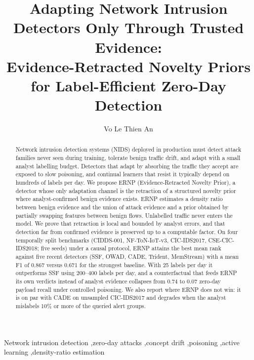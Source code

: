 \documentclass[preprint,12pt]{elsarticle}
\begin{document}
\begin{frontmatter}

\title{Adapting Network Intrusion Detectors Only Through Trusted Evidence:\\ Evidence-Retracted Novelty Priors for Label-Efficient Zero-Day Detection}

\author[aff1]{Vo Le Thien An}

\begin{abstract}
Network intrusion detection systems (NIDS) deployed in production must detect attack families never seen during training, tolerate benign traffic drift, and adapt with a small analyst labelling budget. Detectors that adapt by absorbing the traffic they accept are exposed to slow poisoning, and continual learners that resist it typically depend on hundreds of labels per day. We propose ERNP (Evidence-Retracted Novelty Prior), a detector whose only adaptation channel is the retraction of a structured novelty prior where analyst-confirmed benign evidence exists. ERNP estimates a density ratio between benign evidence and the union of attack evidence and a prior obtained by partially swapping features between benign flows. Unlabelled traffic never enters the model. We prove that retraction is local and bounded by analyst errors, and that detection far from confirmed evidence is preserved up to a computable factor. On four temporally split benchmarks (CIDDS-001, NF-ToN-IoT-v3, CIC-IDS2017, CSE-CIC-IDS2018; five seeds) under a causal protocol, ERNP attains the best mean rank against five recent detectors (SSF, OWAD, CADE, Trident, MemStream) with a mean F1 of 0.867 versus 0.671 for the strongest baseline. With 25 labels per day it outperforms SSF using 200--400 labels per day, and a counterfactual that feeds ERNP its own verdicts instead of analyst evidence collapses from 0.74 to 0.07 zero-day payload recall under controlled poisoning. We also report where ERNP does not win: it is on par with CADE on unsampled CIC-IDS2017 and degrades when the analyst mislabels 10\% or more of the queried alert groups.
\end{abstract}

\begin{keyword}
Network intrusion detection \sep zero-day attacks \sep concept drift \sep poisoning \sep active learning \sep density-ratio estimation
\end{keyword}
\end{frontmatter}
\end{document}
